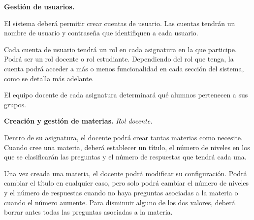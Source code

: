 \begin{rf0}

	\item \textbf{Gestión de usuarios.}
			\begin{rf0*}
				\item El sistema deberá permitir crear cuentas de usuario. Las cuentas tendrán un nombre de usuario y contraseña que identifiquen a cada usuario.
				\item Cada cuenta de usuario tendrá un rol en cada asignatura en la que participe. Podrá ser un rol docente o rol estudiante. Dependiendo del rol que tenga, la cuenta podrá acceder a más o menos funcionalidad en cada sección del sistema, como se detalla más adelante.
				\item El equipo docente de cada asignatura determinará qué alumnos pertenecen a sus grupos.
			\end{rf0*} 

	\item \textbf{Creación y gestión de materias.}  \textit{Rol docente.} 
			\begin{rf0*}
				\item Dentro de su asignatura, el docente podrá crear tantas materias como necesite. Cuando cree una materia, deberá establecer un título, el número de niveles en los que se clasificarán las preguntas y el número de respuestas que tendrá cada una.
				\item Una vez creada una materia, el docente podrá modificar su configuración. Podrá cambiar el título en cualquier caso, pero solo podrá cambiar el número de niveles y el número de respuestas cuando no haya preguntas asociadas a la materia o cuando el número aumente. Para disminuir alguno de los dos valores, deberá borrar antes todas las preguntas asociadas a la materia.
			\end{rf0*}


\end{rf0}

